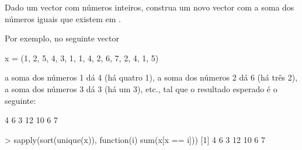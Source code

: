\documentclass{exam}
\begin{document}
\begin{questions}
\question Dado um vector  com números inteiros, construa um novo vector com a soma dos números iguais que existem em .

Por exemplo, no seguinte vector 

\begin{rcode}
	x = (1, 2, 5, 4, 3, 1, 1, 4, 2, 6, 7, 2, 4, 1, 5)
\end{rcode}

a soma dos números 1 dá 4 (há quatro 1), a soma dos números 2 dá 6 (há três 2), a soma dos números 3 dá 3 (há um 3), etc., tal que o resultado esperado é o seguinte:

\begin{rcode}
	[1]  4  6  3 12 10  6  7
\end{rcode}

\begin{solution}
	\begin{rcode}
		> sapply(sort(unique(x)), function(i) sum(x[x == i]))
		[1]  4  6  3 12 10  6  7
	\end{rcode}
	\end{solution}

\end{questions}
\end{document}
